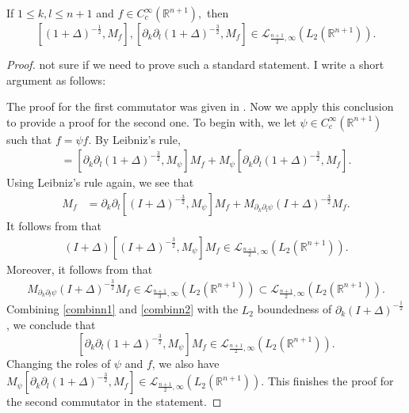\documentclass[12pt]{amsart}
\begin{document}
\begin{lemma}\label{iii verification first lemma} If $1\leq k,l\leq n+1$ and $f\in C^{\infty}_c(\mathbb{R}^{n+1}),$ then
$$[(1+\Delta)^{-\frac12},M_f],[\partial_k\partial_l(1+\Delta)^{-\frac32},M_f]\in \mathcal{L}_{\frac{n+1}{2},\infty}(L_2(\mathbb{R}^{n+1})).$$
\end{lemma}
\begin{proof} {\color{red} not sure if we need to prove such a standard statement.} {\color{blue}I write a short argument as follows:}

The proof for the first commutator was given in \cite[Theorem 5.1 (iv)]{MR4628890}. Now we apply this conclusion to provide a proof for the second one. To begin with, we let $\psi\in C_c^\infty(\mathbb{R}^{n+1})$ such that $f=\psi f$. By Leibniz's rule,
\begin{align*}
[\partial_k\partial_l(1+\Delta)^{-\frac32},M_f]
=[\partial_k\partial_l(1+\Delta)^{-\frac32},M_\psi]M_f+M_\psi[\partial_k\partial_l(1+\Delta)^{-\frac32},M_f].
\end{align*}
Using Leibniz's rule again, we see that
\begin{align*}
[\partial_k\partial_l(1+\Delta)^{-\frac32},M_\psi]M_f
&=\partial_k\partial_l[(I+\Delta)^{-\frac32},M_\psi]M_f+M_{\partial_k\partial_l\psi}(I+\Delta)^{-\frac{3}{2}}M_f.
\end{align*}
It follows from \cite[Theorem 5.1 (iv)]{MR4628890} that
\begin{align}\label{combinn1}
(I+\Delta)[(I+\Delta)^{-\frac32},M_\psi]M_f\in\mathcal{L}_{\frac{n+1}{2},\infty}(L_2(\mathbb{R}^{n+1})).
\end{align}
Moreover, it follows from \cite[Theorem 5.1 (iii)]{MR4628890} that
\begin{align}\label{combinn2}
M_{\partial_k\partial_l\psi}(I+\Delta)^{-\frac{3}{2}}M_f\in \mathcal{L}_{\frac{n+1}{3},\infty}(L_2(\mathbb{R}^{n+1}))\subset\mathcal{L}_{\frac{n+1}{2},\infty}(L_2(\mathbb{R}^{n+1})).
\end{align}
Combining \eqref{combinn1} and \eqref{combinn2} with the $L_2$ boundedness of $\partial_k(I+\Delta)^{-\frac12}$, we conclude that
$$[\partial_k\partial_l(1+\Delta)^{-\frac32},M_\psi]M_f\in \mathcal{L}_{\frac{n+1}{2},\infty}(L_2(\mathbb{R}^{n+1})).$$
Changing the roles of $\psi$ and $f$, we also have $M_\psi[\partial_k\partial_l(1+\Delta)^{-\frac32},M_f]\in \mathcal{L}_{\frac{n+1}{2},\infty}(L_2(\mathbb{R}^{n+1})).$ This finishes the proof for the second commutator in the statement.
\end{proof}
\end{document}
